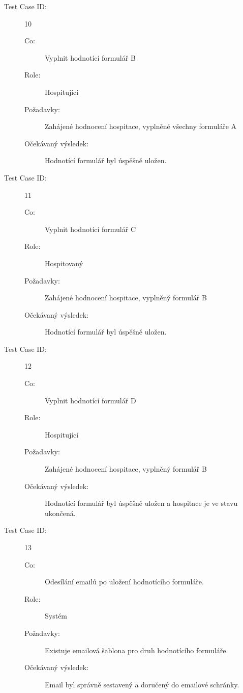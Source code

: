 \begin{description}
\item[Test Case ID:] 10
\begin{description}
\item[Co:] Vyplnit hodnotící formulář B
\item[Role:] Hospitující
\item[Požadavky:] Zahájené hodnocení hospitace, vyplněné všechny formuláře A
\item[Očekávaný výsledek:] Hodnotící formulář byl úspěšně uložen.
\end{description}
\end{description}

\begin{description}
\item[Test Case ID:] 11
\begin{description}
\item[Co:] Vyplnit hodnotící formulář C
\item[Role:] Hospitovaný
\item[Požadavky:] Zahájené hodnocení hospitace, vyplněný formulář B
\item[Očekávaný výsledek:] Hodnotící formulář byl úspěšně uložen.
\end{description}
\end{description}

\begin{description}
\item[Test Case ID:] 12
\begin{description}
\item[Co:] Vyplnit hodnotící formulář D
\item[Role:] Hospitující
\item[Požadavky:] Zahájené hodnocení hospitace, vyplněný formulář B
\item[Očekávaný výsledek:] Hodnotící formulář byl úspěšně uložen a hospitace je ve stavu ukončená.
\end{description}
\end{description}

\begin{description}
\item[Test Case ID:] 13
\begin{description}
\item[Co:] Odesílání emailů po uložení hodnotícího formuláře.
\item[Role:] Systém
\item[Požadavky:] Existuje emailová šablona pro druh hodnotícího formuláře.
\item[Očekávaný výsledek:] Email byl správně sestavený a doručený do emailové schránky.
\end{description}
\end{description}

